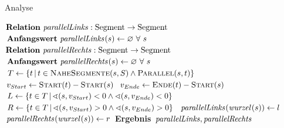\documentclass[../main/thesis.tex]{subfiles}
\begin{document}

\begin{algorithmhere}{Analyse}
\label{alg:Analyse}
\begin{algorithmic}
\State $\textbf{Relation}\ \relation{parallelLinks} : \textrm{Segment} \rightarrow \textrm{Segment}$
\State $\textbf{Anfangswert}\ \relation{parallelLinks}[s] \eqdefrel \Nil\ \forall\ s$
\State $\textbf{Relation}\ \relation{parallelRechts} : \textrm{Segment} \rightarrow \textrm{Segment}$
\State $\textbf{Anfangswert}\ \relation{parallelRechts}[s] \eqdefrel \Nil\ \forall\ s$
		\State $T \gets \Set{t \SetCond t \in \textproc{NaheSegmente}(s, S) \wedge \textproc{Parallel}(s, t)}$  %
		\State $v_{Start} \gets \textproc{Start}(t) - \textproc{Start}(s)$
		\State $v_{Ende} \gets \textproc{Ende}(t) - \textproc{Start}(s)$
		\State $L \gets \{t \in T \,|\, \sphericalangle (s, v_{Start}) < 0 \wedge \sphericalangle (s, v_{Ende}) < 0\}$
		\State $R \gets \{t \in T \,|\, \sphericalangle (s, v_{Start}) > 0 \wedge \sphericalangle (s, v_{Ende}) > 0\}$
		\State{}
		\State{}
				\State $\relation{parallelLinks}[\relation{wurzel}[s]] \gets l$
			\EndIf
		\EndFor
				\State $\relation{parallelRechts}[\relation{wurzel}[s]] \gets r$
			\EndIf
		\EndFor
	\EndFor
	\State \textbf{Ergebnis} $\relation{parallelLinks}, \relation{parallelRechts}$
\EndFunction
\end{algorithmic}
\end{algorithmhere}
\end{document}
